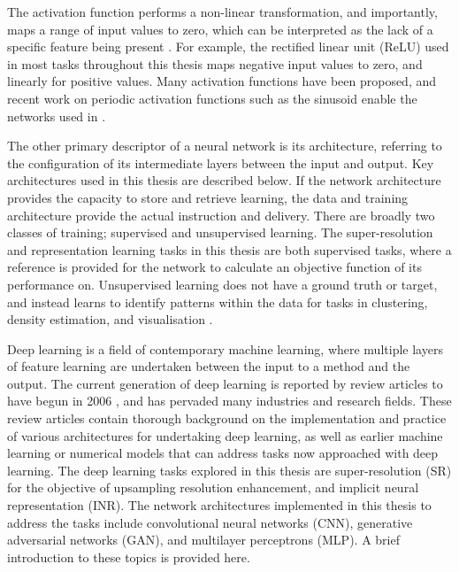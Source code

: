 The activation function performs a non-linear transformation, and importantly, maps a range of input values to zero, which can be interpreted as the lack of a specific feature being present \parencite{williamsLogicActivationFunctions1986}.
For example, the rectified linear unit (ReLU) used in most tasks throughout this thesis maps negative input values to zero, and linearly for positive values.
Many activation functions have been proposed, and recent work on periodic activation functions such as the sinusoid \parencite{sitzmann2019siren} enable the networks used in .

The other primary descriptor of a neural network is its architecture, referring to the configuration of its intermediate layers between the input and output.
Key architectures used in this thesis are described below.
If the network architecture provides the capacity to store and retrieve learning, the data and training architecture provide the actual instruction and delivery.
There are broadly two classes of training; supervised and unsupervised learning.
The super-resolution and representation learning tasks in this thesis are both supervised tasks, where a reference is provided for the network to calculate an objective function of its performance on.
Unsupervised learning does not have a ground truth or target, and instead learns to identify patterns within the data for tasks in clustering, density estimation, and visualisation \parencite{bishopPatternRecognitionMachine2006}.

Deep learning is a field of contemporary machine learning, where multiple layers of feature learning are undertaken between the input to a method and the output.
The current generation of deep learning is reported by review articles to have begun in 2006 \parencite{dengDeepLearningMethods2014,goodfellowDeepLearning2016a}, and has pervaded many industries and research fields.
These review articles contain thorough background on the implementation and practice of various architectures for undertaking deep learning, as well as earlier machine learning or numerical models that can address tasks now approached with deep learning.
The deep learning tasks explored in this thesis are super-resolution (SR) for the objective of upsampling resolution enhancement, and implicit neural representation (INR).
The network architectures implemented in this thesis to address the tasks include convolutional neural networks (CNN), generative adversarial networks (GAN), and multilayer perceptrons (MLP).
A brief introduction to these topics is provided here.

